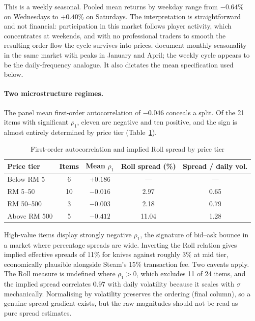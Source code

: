 \documentclass[11pt,a4paper]{article}
\begin{document}
This is a weekly seasonal. Pooled mean returns by weekday range from $-0.64\%$
on Wednesdays to $+0.40\%$ on Saturdays. The interpretation is
straightforward and not financial: participation in this market follows player
activity, which concentrates at weekends, and with no professional traders to
smooth the resulting order flow the cycle survives into prices.
\citet{Dobrynskaya2025} document monthly seasonality in the same market with
peaks in January and April; the weekly cycle appears to be the daily-frequency
analogue. It also dictates the mean specification used below.

\paragraph{Two microstructure regimes.}
The panel mean first-order autocorrelation of $-0.046$ conceals a split. Of the
21 items with significant $\rho_1$, eleven are negative and ten positive, and
the sign is almost entirely determined by price tier
(Table~\ref{tab:rho1}).

\begin{table}[htbp]
\centering
\caption{First-order autocorrelation and implied Roll spread by price tier}
\label{tab:rho1}
\begin{tabular}{lcccc}
\toprule
Price tier & Items & Mean $\rho_1$ & Roll spread (\%) & Spread / daily vol. \\
\midrule
Below RM 5   & 6  & $+0.186$ & --- & --- \\
RM 5--50     & 10 & $-0.016$ & 2.97 & 0.65 \\
RM 50--500   & 3  & $-0.003$ & 2.18 & 0.79 \\
Above RM 500 & 5  & $-0.412$ & 11.04 & 1.28 \\
\bottomrule
\end{tabular}
\end{table}

High-value items display strongly negative $\rho_1$, the signature of
bid--ask bounce \citep{Roll1984} in a market where percentage spreads are
wide. Inverting the Roll relation gives implied effective spreads of 11\% for
knives against roughly 3\% at mid tier, economically plausible alongside
Steam's 15\% transaction fee. Two caveats apply. The Roll measure is undefined
where $\rho_1 > 0$, which excludes 11 of 24 items, and the implied spread
correlates 0.97 with daily volatility because it scales with $\sigma$
mechanically. Normalising by volatility preserves the ordering (final column),
so a genuine spread gradient exists, but the raw magnitudes should not be read
as pure spread estimates.
\end{document}
